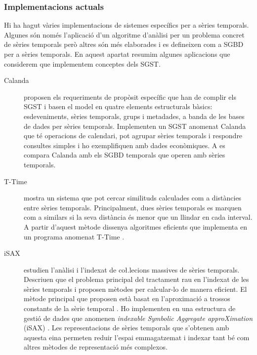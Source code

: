 \subsubsection{Implementacions actuals}

Hi ha hagut vàries implementacions de sistemes específics per a sèries
temporals. Algunes són només l'aplicació d'un algoritme d'anàlisi per
un problema concret de sèries temporals però altres són més elaborades
i es defineixen com a SGBD per a sèries temporals.  En aquest apartat
resumim algunes aplicacions que considerem que implementem conceptes
dels SGST.



\begin{description}

\item[Calanda] \textcite{dreyer94} proposen els requeriments de propòsit específic que han de complir els SGST i basen el model en quatre elements estructurals bàsics: esdeveniments, sèries temporals, grups i metadades, a banda de les bases de dades per sèries temporals. Implementen un SGST anomenat Calanda \parencite{dreyer94b,dreyer95,dreyer95b} que té operacions de calendari, pot agrupar sèries temporals i respondre consultes simples i ho exemplifiquen amb dades econòmiques. A \cite{schmidt95} es compara Calanda amb els SGBD temporals que operen amb sèries temporals. 




\item[T-Time] \textcite{assfalg08:thesis} mostra un sistema que pot cercar similituds calculades com a distàncies entre sèries temporals. Principalment, dues sèries temporals es marquen com a similars si la seva distància és menor que un llindar en cada interval. A partir d'aquest mètode dissenya algoritmes eficients que implementa en un programa anomenat T-Time \parencite{assfalg08:ttime}.


 
\item[iSAX] \textcite{keogh08:isax,keogh10:isax} estudien l'anàlisi i l'indexat de co\l.lecions massives de sèries temporals. Descriuen que el problema principal del tractament rau en l'indexat de les sèries temporals i proposen mètodes per calcular-lo de manera eficient. El mètode principal que proposen està basat en l'aproximació a trossos constants de la sèrie temporal \parencite{keogh00}.  Ho implementen en una estructura de gestió de dades que anomenen \emph{indexable Symbolic Aggregate approXimation} (iSAX) \parencite{isax}. Les representacions de sèries temporals que s'obtenen amb aquesta eina permeten reduir l'espai emmagatzemat i indexar tant bé com altres mètodes de representació més complexos.





\end{description}
